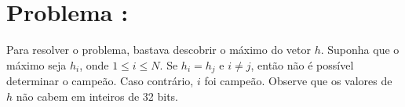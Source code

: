 \section*{Problema \proxLetra: }

Para resolver o problema, bastava descobrir o máximo do vetor $h$. Suponha que o máximo seja $h_i$, onde $1 \leq i \leq N$. Se $h_i = h_j$ e $i \neq j$, então não é possível determinar o campeão. Caso contrário, $i$ foi campeão. Observe que os valores de $h$ não cabem em inteiros de 32 bits.


